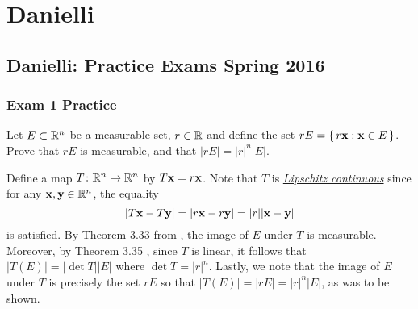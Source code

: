 \section{Danielli}
\subsection{Danielli: Practice Exams Spring 2016}
\setcounter{exercise}{0}

\subsubsection{Exam 1 Practice}
\begin{problem}
  Let $E\subset\mathbb{R}^n$ be a measurable set, $r\in\mathbb{R}$ and define the set
  $rE=\left\{\,r\mathbf{x}:\mathbf{x}\in E\,\right\}$. Prove that $rE$ is measurable,
  and that $|rE|=|r|^n|E|$.
\end{problem}
\begin{solution}
  Define a map $T\colon\mathbb{R}^n\to\mathbb{R}^n$ by $T\mathbf{x}= r\mathbf{x}$. Note that $T$ is
  \href{https://en.wikipedia.org/wiki/Lipschitz_continuity}{\emph{Lipschitz
      continuous}} since for any $\mathbf{x},\mathbf{y}\in\mathbb{R}^n$, the equality
  \begin{equation}
    \label{eq:prep:1:1}
    |T\mathbf{x}-T\mathbf{y}|=|r\mathbf{x}-r\mathbf{y}|=|r||\mathbf{x}-\mathbf{y}|
  \end{equation}
  is satisfied. By Theorem 3.33 from \cite[Ch.\@ 3,
  p.\@55]{wheeden-zygmund}, the image of $E$ under $T$ is
  measurable. Moreover, by Theorem 3.35 \cite[Ch.\@ 3, p.\@
  56]{wheeden-zygmund}, since $T$ is linear, it follows that
  $|T(E)|=|{\det T}||E|$ where $\det T=|r|^n$. Lastly, we note that the
  image of $E$ under $T$ is precisely the set $rE$ so that
  $|T(E)|=|rE|=|r|^n|E|$, as was to be shown.
\end{solution}

